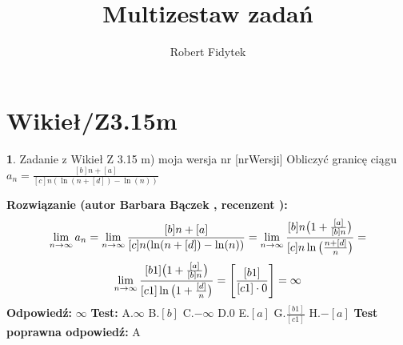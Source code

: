 \documentclass[12pt, a4paper]{article}
\title{Multizestaw zadań}
\author{Robert Fidytek}
\date{}
\theoremstyle{definition} %
\newtheorem{zad}{}
\newcommand{\kategoria}[1]{\section{#1}} %
\newcommand{\zadStart}[1]{\begin{zad}#1\newline} %
\newcommand{\zadStop}{\end{zad}}   %
\newcommand{\rozwStart}[2]{\noindent \textbf{Rozwiązanie (autor #1 , recenzent #2): }\newline} %
\newcommand{\rozwStop}{\newline}                                            %
\newcommand{\odpStart}{\noindent \textbf{Odpowiedź:}\newline}    %
\newcommand{\odpStop}{\newline}                                             %
\newcommand{\testStart}{\noindent \textbf{Test:}\newline} %
\newcommand{\testStop}{\newline} %
\newcommand{\kluczStart}{\noindent \textbf{Test poprawna odpowiedź:}\newline} %
\newcommand{\kluczStop}{\newline} %
\begin{document}
\maketitle


\kategoria{Wikieł/Z3.15m}
\zadStart{Zadanie z Wikieł Z 3.15 m) moja wersja nr [nrWersji]}
Obliczyć granicę ciągu $a_n= \frac{[b]n+[a]}{[c]n(\ln(n+[d])-\ln(n))}$
\zadStop
\rozwStart{Barbara Bączek}{}
$$\lim_{n \rightarrow \infty} a_n= \lim_{n \rightarrow \infty}  \frac{[b]n+[a]}{[c]n(\ln(n+[d])-\ln(n))}= \lim_{n \rightarrow \infty}  \frac{[b]n\big{(}1+\frac{[a]}{[b]n}\big{)}}{[c]n\ln\big{(}\frac{n+[d]}{n}\big{)}}=$$
$$\lim_{n \rightarrow \infty}  \frac{[b1]\big{(}1+\frac{[a]}{[b]n}\big{)}}{[c1] \ln\big{(}1 +\frac{[d]}{n}\big{)}}=\Bigg{[} \frac{[b1]}{[c1] \cdot 0}\Bigg{]}= \infty$$
\rozwStop
\odpStart
$\infty$
\odpStop
\testStart
A.$\infty$
B.$[b]$
C.$-\infty$
D.$0$
E.$[a]$
G.$\frac{[b1]}{[c1]}$
H.$-[a]$
\testStop
\kluczStart
A
\kluczStop
\end{document}
